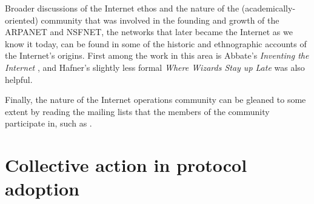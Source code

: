 Broader discussions of the Internet ethos and the nature of the (academically-oriented) community that was involved in the founding and growth of the ARPANET and NSFNET, the networks that later became the Internet as we know it today, can be found in some of the historic and ethnographic accounts of the Internet's origins. First among the work in this area is Abbate's \emph{Inventing the Internet} \cite{Abbate:2000ve}, and Hafner's slightly less formal \emph{Where Wizards Stay up Late} \cite{Hafner:1996qf} was also helpful.

Finally, the nature of the Internet operations community can be gleaned to some extent by reading the mailing lists that the members of the community participate in, such as \cite{NANOG}.

\section{Collective action in protocol adoption}

